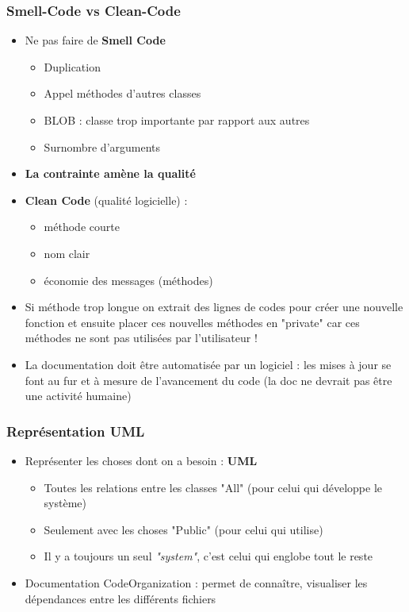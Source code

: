 \documentclass[12pt,a4paper]{article}
\begin{document}
\subsubsection{Smell-Code vs Clean-Code}
\begin{itemize}
\item Ne pas faire de \textbf{Smell Code}
\begin{itemize}
\item Duplication
\item Appel méthodes d'autres classes
\item BLOB : classe trop importante par rapport aux autres
\item Surnombre d'arguments
\end{itemize}
\item \textbf{La contrainte amène la qualité}
\item \textbf{Clean Code} (qualité logicielle) :
\begin{itemize}
\item méthode courte
\item nom clair
\item économie des messages (méthodes)
\end{itemize}
\item Si méthode trop longue on extrait des lignes de codes pour créer une nouvelle fonction et ensuite placer ces nouvelles méthodes en "private" car ces méthodes ne sont pas utilisées par l'utilisateur !
\item La documentation doit être automatisée par un logiciel : les mises à jour se font au fur et à mesure de l'avancement du code (la doc ne devrait pas être une activité humaine)
\end{itemize}
\subsubsection{Représentation UML}
\begin{itemize}
\item Représenter les choses dont on a besoin : \textbf{UML}
\begin{itemize}
\item Toutes les relations entre les classes "All" (pour celui qui développe le système)
\item Seulement avec les choses "Public" (pour celui qui utilise)
\item Il y a toujours un seul \textit{"system"}, c'est celui qui englobe tout le reste
\end{itemize}
\item Documentation CodeOrganization : permet de connaître, visualiser les dépendances entre les différents fichiers
\end{itemize}
\end{document}
